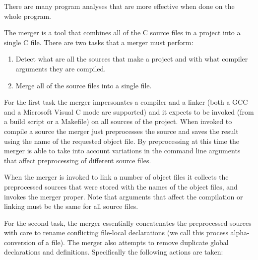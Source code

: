 \documentclass{article}
\begin{document}
 There are many program analyses that are more effective when
done on the whole program.

 The merger is a tool that combines all of the C source files in a project
into a single C file. There are two tasks that a merger must perform:
\begin{enumerate}
\item Detect what are all the sources that make a project and with what
compiler arguments they are compiled.

\item Merge all of the source files into a single file. 
\end{enumerate}

 For the first task the merger impersonates a compiler and a linker (both a
GCC and a Microsoft Visual C mode are supported) and it expects to be invoked
(from a build script or a Makefile) on all sources of the project. When
invoked to compile a source the merger just preprocesses the source and saves
the result using the name of the requested object file. By preprocessing at
this time the merger is able to take into account variations in the command
line arguments that affect preprocessing of different source files.

 When the merger is invoked to link a number of object files it collects the
preprocessed sources that were stored with the names of the object files, and
invokes the merger proper. Note that arguments that affect the compilation or
linking must be the same for all source files.

 For the second task, the merger essentially concatenates the preprocessed
sources with care to rename conflicting file-local declarations (we call this
process alpha-conversion of a file). The merger also attempts to remove
duplicate global declarations and definitions. Specifically the following
actions are taken: 
\end{document}
